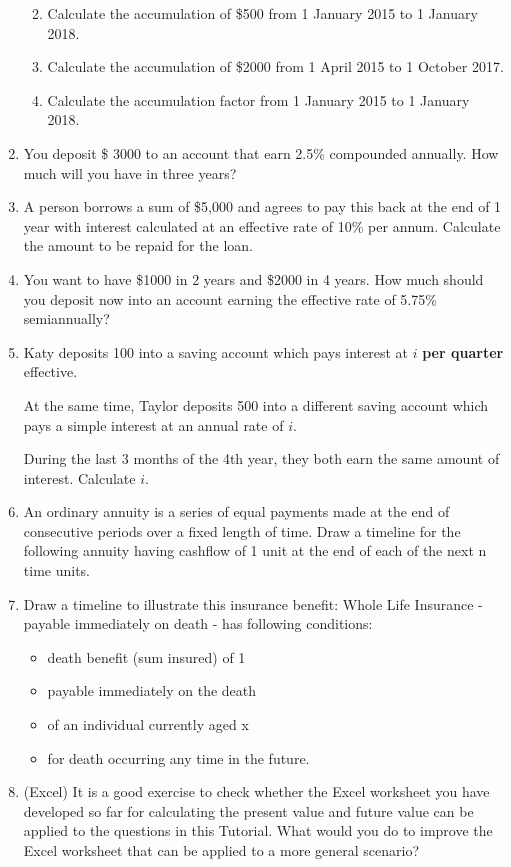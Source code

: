 \documentclass[
]{book}
\theoremstyle{definition}
\theoremstyle{definition}
\theoremstyle{definition}
\theoremstyle{definition}
\theoremstyle{remark}
\begin{document}
\begin{enumerate}
  \begin{enumerate}
  \def\labelenumii{\arabic{enumii}.}
  \item
    Calculate the accumulation of \$500 from 1 January 2015 to 1
    January 2018.
  \item
    Calculate the accumulation of \$2000 from 1 April 2015 to 1
    October 2017.
  \item
    Calculate the accumulation factor from 1 January 2015 to 1
    January 2018.
  \end{enumerate}
\item
  You deposit \$ 3000 to an account that earn 2.5\% compounded
  annually. How much will you have in three years?
\item
  A person borrows a sum of \$5,000 and agrees to pay this back at the
  end of 1 year with interest calculated at an effective rate of 10\%
  per annum. Calculate the amount to be repaid for the loan.
\item
  You want to have \$1000 in 2 years and \$2000 in 4 years. How much
  should you deposit now into an account earning the effective rate of
  5.75\% semiannually?
\item
  Katy deposits 100 into a saving account which pays interest at \(i\)
  \textbf{per quarter} effective.

  At the same time, Taylor deposits 500 into a different saving
  account which pays a simple interest at an annual rate of \(i\).

  During the last 3 months of the 4th year, they both earn the same
  amount of interest. Calculate \(i\).
\item
  An ordinary annuity is a series of equal payments made at the end of
  consecutive periods over a fixed length of time. Draw a timeline for
  the following annuity having cashflow of 1 unit at the end of each
  of the next n time units.
\item
  Draw a timeline to illustrate this insurance benefit: Whole Life
  Insurance - payable immediately on death - has following conditions:

  \begin{itemize}
  \item
    death benefit (sum insured) of 1
  \item
    payable immediately on the death
  \item
    of an individual currently aged x
  \item
    for death occurring any time in the future.
  \end{itemize}
\item
  (Excel) It is a good exercise to check whether the Excel worksheet
  you have developed so far for calculating the present value and
  future value can be applied to the questions in this Tutorial. What
  would you do to improve the Excel worksheet that can be applied to a
  more general scenario?
\end{enumerate}
\end{document}
